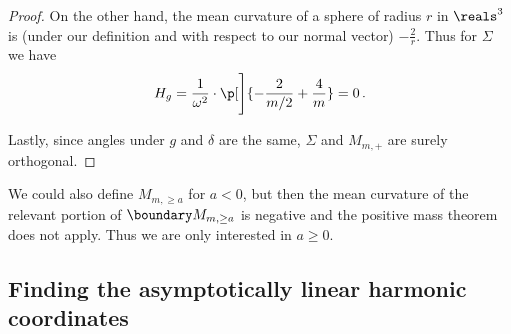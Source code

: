 \documentclass[titlepage,numbers=noenddot,oneside,%
cleardoublepage=empty,paper=a4,fontsize=11pt,%
english,%
]{scrartcl}
\newcommand*{\mathfullstop}{\,.}
\begin{document}
\begin{proof}
    On the other hand, the mean curvature of a sphere of radius \( r \) in \( \reals^3 \) is (under our definition and with respect to our normal vector) \( -\frac{2}{r} \). Thus for \( \Sigma \) we have
    \begin{equation*}
        H_g=\frac{1}{\omega^2}\cdot \p[\Bigg]{-\frac{2}{m/2}+\frac{4}{m}}=0\mathfullstop
    \end{equation*}

    Lastly, since angles under \( g \) and \( \delta \) are the same, \( \Sigma \) and \( M_{m,+} \) are surely orthogonal. 
\end{proof}

\begin{remark}
    We could also define \( M_{m,\geq a} \) for \( a<0 \), but then the mean curvature of the relevant portion of \( \modifiedschwarzschildboundary \) is negative and the positive mass theorem does not apply. Thus we are only interested in \( a\geq 0 \).
\end{remark}
\subsection{Finding the asymptotically linear harmonic coordinates}
\end{document}
